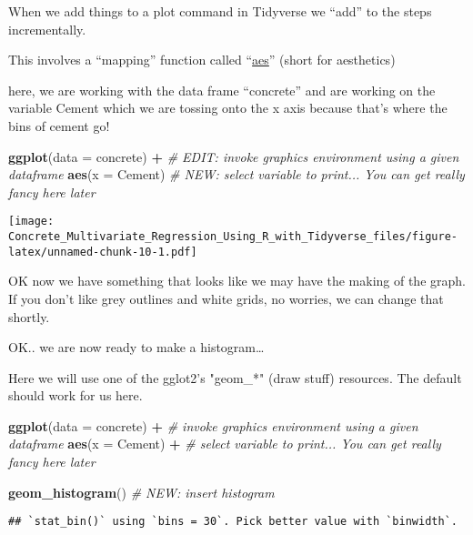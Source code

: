 \documentclass[]{article}
\newenvironment{Shaded}{\begin{snugshade}}{\end{snugshade}}
\newcommand{\CommentTok}[1]{\textcolor[rgb]{0.56,0.35,0.01}{\textit{#1}}}
\newcommand{\DataTypeTok}[1]{\textcolor[rgb]{0.13,0.29,0.53}{#1}}
\newcommand{\KeywordTok}[1]{\textcolor[rgb]{0.13,0.29,0.53}{\textbf{#1}}}
\newcommand{\NormalTok}[1]{#1}
\newcommand{\OperatorTok}[1]{\textcolor[rgb]{0.81,0.36,0.00}{\textbf{#1}}}
\newcommand{\StringTok}[1]{\textcolor[rgb]{0.31,0.60,0.02}{#1}}
\begin{document}
When we add things to a plot command in Tidyverse we ``add'' to the
steps incrementally.

This involves a ``mapping'' function called
``\href{https://ggplot2.tidyverse.org/reference/aes.html}{aes}'' (short
for aesthetics)

here, we are working with the data frame ``concrete'' and are working on
the variable Cement which we are tossing onto the x axis because that's
where the bins of cement go!

\begin{Shaded}
\begin{Highlighting}[]
\KeywordTok{ggplot}\NormalTok{(}\DataTypeTok{data =}\NormalTok{ concrete) }\OperatorTok{+}\StringTok{   }\CommentTok{# EDIT:  invoke graphics environment using a given dataframe}
\StringTok{  }
\StringTok{  }\KeywordTok{aes}\NormalTok{(}\DataTypeTok{x    =}\NormalTok{ Cement)        }\CommentTok{# NEW: select variable to print... You can get really fancy here later}
\end{Highlighting}
\end{Shaded}

\texttt{[image: Concrete\_Multivariate\_Regression\_Using\_R\_with\_Tidyverse\_files/figure-latex/unnamed-chunk-10-1.pdf]}

OK now we have something that looks like we may have the making of the
graph. If you don't like grey outlines and white grids, no worries, we
can change that shortly.

OK.. we are now ready to make a histogram\ldots{}

Here we will use one of the gglot2's "geom\_*" (draw stuff) resources.
The default should work for us here.

\begin{Shaded}
\begin{Highlighting}[]
\KeywordTok{ggplot}\NormalTok{(}\DataTypeTok{data =}\NormalTok{ concrete) }\OperatorTok{+}\StringTok{   }\CommentTok{# invoke graphics environment using a given dataframe}
\StringTok{  }
\StringTok{  }\KeywordTok{aes}\NormalTok{(}\DataTypeTok{x =}\NormalTok{ Cement)   }\OperatorTok{+}\StringTok{       }\CommentTok{# select variable to print... You can get really fancy here later}

\StringTok{  }\KeywordTok{geom_histogram}\NormalTok{()          }\CommentTok{# NEW: insert histogram}
\end{Highlighting}
\end{Shaded}

\begin{verbatim}
## `stat_bin()` using `bins = 30`. Pick better value with `binwidth`.
\end{verbatim}
\end{document}
